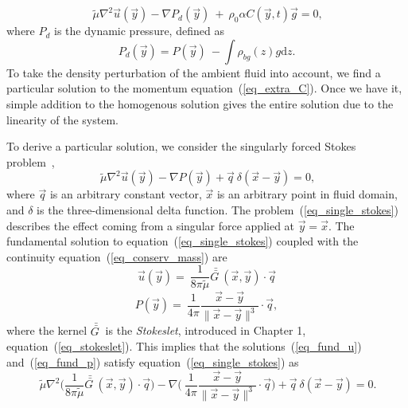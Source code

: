 		 \begin{equation}
		\ \tilde{\mu}\nabla^2 \vec{u}(\vec{y})
		- \nabla P_d (\vec{y}) \ + \  
		 \rho_0 \alpha C(\vec{y},t) \vec{g} =0 , 
	\label{eq_extra_C}
	\end{equation}
	where $P_d$ is the dynamic pressure, defined as
\begin{equation}
	P_d (\vec{y})
	 = P (\vec{y}) \ - \int \rho_{bg}(z) g   \textrm{d}z.
	\label{eq_Pd}
\end{equation}
To take the density perturbation of the ambient fluid into account, we find a particular solution to the momentum equation~(\ref{eq_extra_C}). Once we have it, simple addition to the homogenous solution gives the entire solution due to the linearity of the system. 
\par
To derive a particular solution, we consider the singularly forced Stokes problem~\cite{pozrikidis_boundary_1992},
\begin{equation}
	\ \tilde{\mu} \nabla^2 \vec{u}(\vec{y})
	- \nabla P (\vec{y})
	+\vec{q} \ \delta \left(\vec{x} - \vec{y} \right) =0,
\label{eq_single_stokes}
\end{equation}
where $\vec{q}$ is an arbitrary constant vector, $\vec{x}$ is an arbitrary point in fluid domain, and $\delta$ is the three-dimensional delta function.
The problem~(\ref{eq_single_stokes}) 
describes the effect coming from a singular force applied at $\vec{y} = \vec{x}.$
The fundamental solution to equation~(\ref{eq_single_stokes}) coupled with the continuity equation~(\ref{eq_conserv_mass}) are
\begin{equation}
	\vec{u} (\vec{y}) = \ \frac{1}{8\pi \tilde{\mu}}  \bar{\bar{G \ }}(\vec{x}, \vec{y})
	\cdot  \vec{q}
\label{eq_fund_u}
\end{equation}
\begin{equation}
	P (\vec{y}) = \ \frac{1}{4\pi }  
	\frac{\vec{x} - \vec{y}}{\| \vec{x} - \vec{y}\|^3}
	\cdot  \vec{q},
\label{eq_fund_p}
\end{equation}
where the kernel $\bar{\bar{G \ }}$ is the \textit{Stokeslet}, introduced in Chapter 1, equation~(\ref{eq_stokeslet}).
This implies that the solutions~(\ref{eq_fund_u}) and~(\ref{eq_fund_p}) satisfy equation~(\ref{eq_single_stokes}) as
\begin{equation}
	\ \tilde{\mu} \nabla^2 
	\biggl( \frac{1}{8\pi \tilde{\mu}}  \bar{\bar{G \ }}(\vec{x}, \vec{y})
	\cdot  \vec{q} \biggr)
	- \nabla \biggl(\ \frac{1}{4\pi }  
	\frac{\vec{x} - \vec{y}}{\| \vec{x} - \vec{y}\|^3}
	\cdot  \vec{q} \biggr)
	+ \vec{q} \ \delta \left(\vec{x} - \vec{y} \right)
	=0.
\label{eq_single_stokes_sub}
\end{equation}
